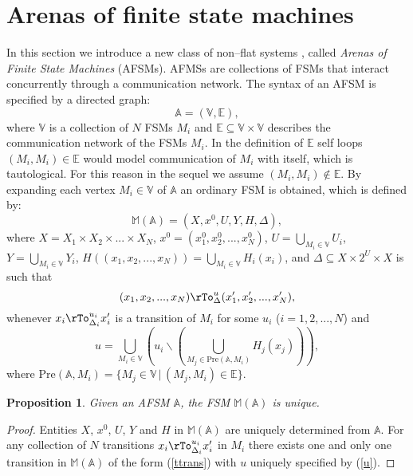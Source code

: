 \documentclass{amsart}
\newtheorem{proposition}[theorem]{Proposition}
\theoremstyle{definition}
\theoremstyle{remark}
\numberwithin{equation}{section}
\newcommand{\Pre}{\mathrm{Pre}}
\begin{document}
\section{Arenas of finite state machines}
In this section we introduce a new class of non--flat systems \cite{HFSM1,CHSM}, called \textit{Arenas of Finite State Machines} (AFSMs). AFMSs 
are collections of FSMs that interact concurrently through a communication network. 
The syntax of an AFSM is specified by a directed graph: 
\[
\mathbb{A}=(\mathbb{V},\mathbb{E}), 
\]
where $\mathbb{V}$ is a collection of $N$ FSMs $M_{i}$ and $\mathbb{E}\subseteq \mathbb{V} \times \mathbb{V}$ describes the communication network of the FSMs $M_{i}$. 
In the definition of $\mathbb{E}$ self loops $(M_{i},M_{i})\in \mathbb{E}$ would model communication of $M_{i}$ with itself, which is tautological. For this reason in the sequel we assume $(M_{i},M_{i})\notin \mathbb{E}$. 
By expanding each vertex $M_{i}\in \mathbb{V}$ of $\mathbb{A}$ an ordinary FSM is obtained, which is defined by:
\[
\mathbb{M}(\mathbb{A})=(X,x^{0},U,Y,H,\Delta),
\]
where $X=X_{1}\times X_{2} \times ... \times X_{N}$, $x^{0}=(x^{0}_{1},x^{0}_{2},...,x^{0}_{N})$, $U=\bigcup_{M_{i}\in \mathbb{V}} U_{i}$, $Y=\bigcup_{M_{i}\in \mathbb{V}}Y_{i}$, $H((x_{1},x_{2},...,x_{N}))=\bigcup_{M_{i}\in \mathbb{V}} H_{i}(x_{i})$, and $\Delta \subseteq X\times 2^{U} \times X$ is such that 
\begin{equation}
\label{ttrans}
(x_{1},x_{2},...,x_{N})\rTo_{\Delta}^{u} (x_{1}^{\prime},x_{2}^{\prime},...,x_{N}^{\prime}),
\end{equation}
whenever $x_{i} \rTo_{\Delta_{i}}^{u_{i}} x^{\prime}_{i}$ is a transition of $M_{i}$ for some $u_{i}$ ($i=1,2,...,N$) and 
\begin{equation}
\label{u}
u=\bigcup_{M_{i}\in \mathbb{V}} (u_{i}\backslash (\bigcup_{M_{j}\in \Pre(\mathbb{A},M_{i})}H_{j}(x_{j}))),
\end{equation}
where $\Pre(\mathbb{A},M_{i})=\{M_{j}\in \mathbb{V}\,|\,(M_{j},M_{i})\in \mathbb{E}\}$. 

\begin{proposition}
Given an AFSM $\mathbb{A}$, the FSM $\mathbb{M}(\mathbb{A})$ is unique.
\end{proposition}

\begin{proof}
Entities $X$, $x^{0}$, $U$, $Y$ and $H$ in $\mathbb{M}(\mathbb{A})$ are uniquely determined from $\mathbb{A}$. For any collection of $N$ transitions $x_{i} \rTo_{\Delta_{i}}^{u_{i}} x^{\prime}_{i}$ in $M_{i}$ there exists one and only one transition in $\mathbb{M}(\mathbb{A})$ of the form (\ref{ttrans}) with $u$ uniquely specified by (\ref{u}).
\end{proof}
\end{document}
